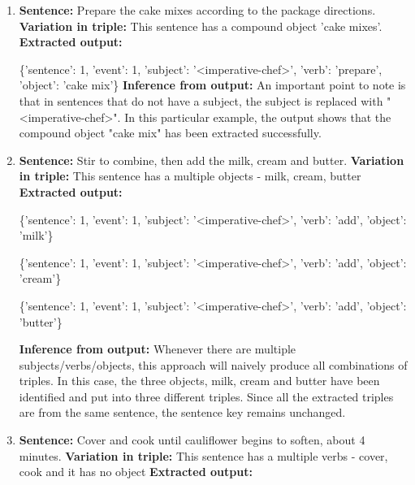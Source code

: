 \documentclass[11pt,letterpaper]{article}
\begin{document}
\begin{enumerate}
    \item
    \textbf{Sentence:} Prepare the cake mixes according to the package directions. \newline
    \textbf{Variation in triple:} This sentence has a compound object 'cake mixes'.
    \newline
    \textbf{Extracted output:} 
    
    \{'sentence': 1, 'event': 1, 'subject': '<imperative-chef>', 'verb': 'prepare', 'object': 'cake mix'\}
    \newline
    \textbf{Inference from output:} 
    An important point to note is that in sentences that do not have a subject, the subject is replaced with "<imperative-chef>". In this particular example, the output shows that the compound object "cake mix" has been extracted successfully.
    
    \item
    \textbf{Sentence:} Stir to combine, then add the milk, cream and butter.
    \newline
    \textbf{Variation in triple:} This sentence has a multiple objects - milk, cream, butter
    \newline
    \textbf{Extracted output:} 
    
    \{'sentence': 1, 'event': 1, 'subject': '<imperative-chef>', 'verb': 'add', 'object': 'milk'\}
    
    \{'sentence': 1, 'event': 1, 'subject': '<imperative-chef>', 'verb': 'add', 'object': 'cream'\}
    
    \{'sentence': 1, 'event': 1, 'subject': '<imperative-chef>', 'verb': 'add', 'object': 'butter'\}
    
    \textbf{Inference from output:} 
    Whenever there are multiple subjects/verbs/objects, this approach will naively produce all combinations of triples. In this case, the three objects, milk, cream and butter have been identified and put into three different triples. Since all the extracted triples are from the same sentence, the sentence key remains unchanged.
    
    \item
    \textbf{Sentence:} Cover and cook until cauliflower begins to soften, about 4 minutes.
    \newline
    \textbf{Variation in triple:} This sentence has a multiple verbs - cover, cook and it has no object
    \newline
    \textbf{Extracted output:} 
    

\end{enumerate}
\end{document}
